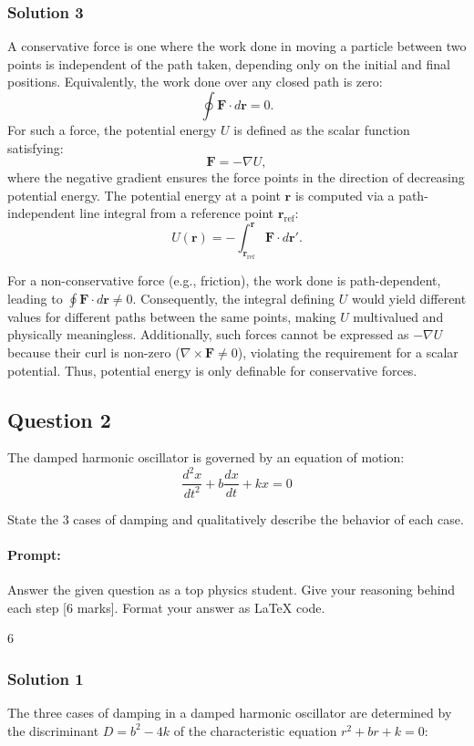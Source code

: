 \documentclass{article}
\begin{document}
\subsubsection{Solution 3}
A conservative force is one where the work done in moving a particle between two points is independent of the path taken, depending only on the initial and final positions. Equivalently, the work done over any closed path is zero:  
\[
\oint \mathbf{F} \cdot d\mathbf{r} = 0.
\]  
For such a force, the potential energy \( U \) is defined as the scalar function satisfying:  
\[
\mathbf{F} = -\nabla U,
\]  
where the negative gradient ensures the force points in the direction of decreasing potential energy. The potential energy at a point \(\mathbf{r}\) is computed via a path-independent line integral from a reference point \(\mathbf{r}_\text{ref}\):  
\[
U(\mathbf{r}) = -\int_{\mathbf{r}_\text{ref}}^{\mathbf{r}} \mathbf{F} \cdot d\mathbf{r}'.
\]  

For a non-conservative force (e.g., friction), the work done is path-dependent, leading to \(\oint \mathbf{F} \cdot d\mathbf{r} \neq 0\). Consequently, the integral defining \( U \) would yield different values for different paths between the same points, making \( U \) multivalued and physically meaningless. Additionally, such forces cannot be expressed as \(-\nabla U\) because their curl is non-zero (\(\nabla \times \mathbf{F} \neq 0\)), violating the requirement for a scalar potential. Thus, potential energy is only definable for conservative forces.

\subsection{Question 2}
The damped harmonic oscillator is governed by an equation of motion:
\[
\frac{d^2x}{dt^2} + b\frac{dx}{dt} + kx = 0
\]

State the 3 cases of damping and qualitatively describe the behavior of each case.

\paragraph{Prompt: \\} 
Answer the given question as a top physics student. Give your reasoning behind each step [6 marks].
Format your answer as LaTeX code. 


6\subsubsection{Solution 1}
The three cases of damping in a damped harmonic oscillator are determined by the discriminant \( D = b^2 - 4k \) of the characteristic equation \( r^2 + br + k = 0 \):  
\end{document}
